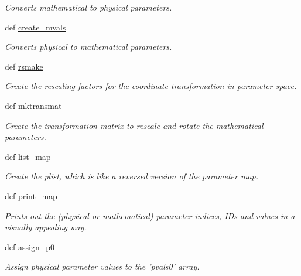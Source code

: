 \begin{DoxyCompactItemize}
\begin{DoxyCompactList}\small\item\em \-Converts mathematical to physical parameters. \end{DoxyCompactList}\item 
def \hyperlink{classforcebalance_1_1forcefield_1_1FF_ae5fba4d3e22f210632ead3653e6e12dd}{create\-\_\-mvals}
\begin{DoxyCompactList}\small\item\em \-Converts physical to mathematical parameters. \end{DoxyCompactList}\item 
def \hyperlink{classforcebalance_1_1forcefield_1_1FF_a88715f96ff8e14c3c83b4f976ad147b4}{rsmake}
\begin{DoxyCompactList}\small\item\em \-Create the rescaling factors for the coordinate transformation in parameter space. \end{DoxyCompactList}\item 
def \hyperlink{classforcebalance_1_1forcefield_1_1FF_acf0ce8fc4e9fbf5257f93d14d4a4f10f}{mktransmat}
\begin{DoxyCompactList}\small\item\em \-Create the transformation matrix to rescale and rotate the mathematical parameters. \end{DoxyCompactList}\item 
def \hyperlink{classforcebalance_1_1forcefield_1_1FF_ac0046446695a65cb2489fdb560ef5929}{list\-\_\-map}
\begin{DoxyCompactList}\small\item\em \-Create the plist, which is like a reversed version of the parameter map. \end{DoxyCompactList}\item 
def \hyperlink{classforcebalance_1_1forcefield_1_1FF_a61082e99cb3a02e35c80bbea919eaafa}{print\-\_\-map}
\begin{DoxyCompactList}\small\item\em \-Prints out the (physical or mathematical) parameter indices, \-I\-Ds and values in a visually appealing way. \end{DoxyCompactList}\item 
def \hyperlink{classforcebalance_1_1forcefield_1_1FF_a3af07734a2378364ed533e2853ee6b82}{assign\-\_\-p0}
\begin{DoxyCompactList}\small\item\em \-Assign physical parameter values to the 'pvals0' array. \end{DoxyCompactList}\item 

\end{DoxyCompactItemize}
